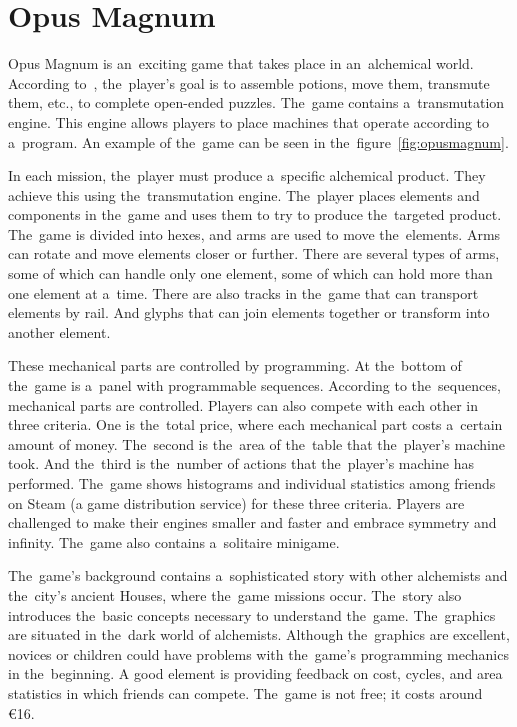\pagebreak
\section{Opus Magnum}
\label{similar-games:opus-magnum}

Opus Magnum is an~exciting game that takes place in an~alchemical world.
According to~\cite{a2022_zachtronics}, the~player's goal is to assemble potions, move them, transmute them, etc., to complete open-ended puzzles.
The~game contains a~transmutation engine.
This engine allows players to place machines that operate according to a~program.
An example of the~game can be seen in the~figure~\ref{fig:opusmagnum}.

In each mission, the~player must produce a~specific alchemical product.
They achieve this using the~transmutation engine.
The~player places elements and components in the~game and uses them to try to produce the~targeted product.
The~game is divided into hexes, and arms are used to move the~elements.
Arms can rotate and move elements closer or further.
There are several types of arms, some of which can handle only one element, some of which can hold more than one element at a~time.
There are also tracks in the~game that can transport elements by rail.
And glyphs that can join elements together or transform into another element.

These mechanical parts are controlled by programming.
At the~bottom of the~game is a~panel with programmable sequences.
According to the~sequences, mechanical parts are controlled.
Players can also compete with each other in three criteria.
One is the~total price, where each mechanical part costs a~certain amount of money.
The~second is the~area of the~table that the~player's machine took.
And the~third is the~number of actions that the~player's machine has performed.
The~game shows histograms and individual statistics among friends on Steam (a game distribution service) for these three criteria.
Players are challenged to make their engines smaller and faster and embrace symmetry and infinity.
The~game also contains a~solitaire minigame.

The~game's background contains a~sophisticated story with other alchemists and the~city's ancient Houses, where the~game missions occur.
The~story also introduces the~basic concepts necessary to understand the~game.
The~graphics are situated in the~dark world of alchemists.
Although the~graphics are excellent, novices or children could have problems with the~game's programming mechanics in the~beginning.
A good element is providing feedback on cost, cycles, and area statistics in which friends can compete.
The~game is not free; it costs around €16.

